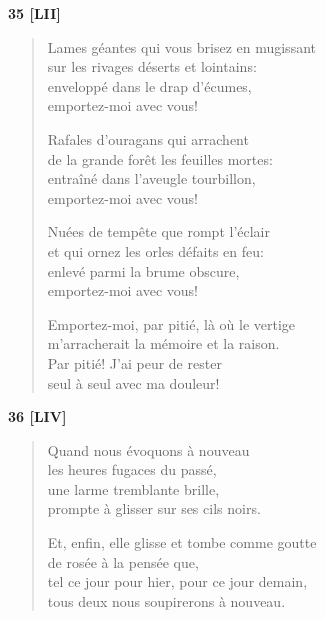 \bigskip

\begin{center}
  \textbf{35 [LII]}
\end{center}

\begin{verse}
  Lames géantes qui vous brisez en mugissant \\
  sur les rivages déserts et lointains: \\
  enveloppé dans le drap d'écumes, \\
  emportez-moi avec vous!

  Rafales d'ouragans qui arrachent \\
  de la grande forêt les feuilles mortes: \\
  entraîné dans l'aveugle tourbillon, \\
  emportez-moi avec vous!

  Nuées de tempête que rompt l'éclair \\
  et qui ornez les orles défaits en feu: \\
  enlevé parmi la brume obscure, \\
  emportez-moi avec vous!

  Emportez-moi, par pitié, là où le vertige \\
  m'arracherait la mémoire et la raison. \\
  Par pitié! J'ai peur de rester \\
  seul à seul avec ma douleur!
\end{verse}

\pagebreak

\begin{center}
  \textbf{36 [LIV]}
\end{center}

\vspace*{-15pt}

\begin{verse}
  Quand nous évoquons à nouveau \\
  les heures fugaces du passé, \\
  une larme tremblante brille, \\
  prompte à glisser sur ses cils noirs.

  Et, enfin, elle glisse et tombe comme goutte \\
  de rosée à la pensée que, \\
  tel ce jour pour hier, pour ce jour demain, \\
  tous deux nous soupirerons à nouveau.
\end{verse}

